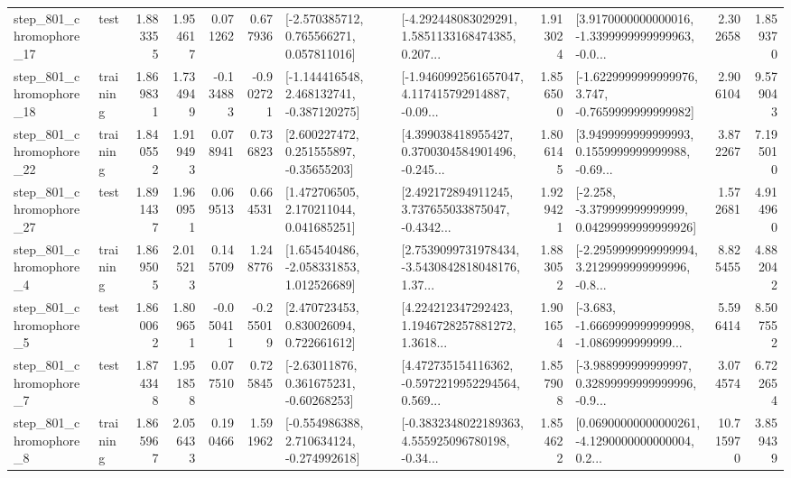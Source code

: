 \begin{tabular}{llrrrrllrlrr}
  step\_801\_chromophore\_17 &      test &      1.883355 &    1.954617 &      0.071262 &  0.677936 &    [-2.570385712, 0.765566271, 0.057811016] &  [-4.292448083029291, 1.5851133168474385, 0.207... &       1.913024 &  [3.9170000000000016, -1.3399999999999963, -0.0... &            2.302658 &          1.859370 \\
  step\_801\_chromophore\_18 &  training &      1.869831 &    1.734949 &     -0.134883 & -0.902721 &   [-1.144416548, 2.468132741, -0.387120275] &  [-1.9460992561657047, 4.117415792914887, -0.09... &       1.856500 &  [-1.6229999999999976, 3.747, -0.7659999999999982] &            2.906104 &          9.579043 \\
  step\_801\_chromophore\_22 &  training &      1.840552 &    1.919493 &      0.078941 &  0.736823 &     [2.600227472, 0.251555897, -0.35655203] &  [4.399038418955427, 0.3700304584901496, -0.245... &       1.806145 &  [3.9499999999999993, 0.1559999999999988, -0.69... &            3.872267 &          7.195010 \\
  step\_801\_chromophore\_27 &      test &      1.891437 &    1.960951 &      0.069513 &  0.664531 &     [1.472706505, 2.170211044, 0.041685251] &  [2.492172894911245, 3.737655033875047, -0.4342... &       1.929421 &  [-2.258, -3.379999999999999, 0.04299999999999926] &            1.572681 &          4.914960 \\
   step\_801\_chromophore\_4 &  training &      1.869505 &    2.015213 &      0.145709 &  1.248776 &    [1.654540486, -2.058331853, 1.012526689] &  [2.7539099731978434, -3.5430842818048176, 1.37... &       1.883052 &  [-2.2959999999999994, 3.2129999999999996, -0.8... &            8.825455 &          4.882042 \\
   step\_801\_chromophore\_5 &      test &      1.860062 &    1.809651 &     -0.050411 & -0.255019 &     [2.470723453, 0.830026094, 0.722661612] &  [4.224212347292423, 1.1946728257881272, 1.3618... &       1.901654 &  [-3.683, -1.6669999999999998, -1.0869999999999... &            5.596414 &          8.507552 \\
   step\_801\_chromophore\_7 &      test &      1.874348 &    1.951858 &      0.077510 &  0.725845 &     [-2.63011876, 0.361675231, -0.60268253] &  [4.472735154116362, -0.5972219952294564, 0.569... &       1.857908 &  [-3.988999999999997, 0.32899999999999996, -0.9... &            3.074574 &          6.722654 \\
   step\_801\_chromophore\_8 &  training &      1.865967 &    2.056433 &      0.190466 &  1.591962 &   [-0.554986388, 2.710634124, -0.274992618] &  [-0.3832348022189363, 4.555925096780198, -0.34... &       1.854622 &  [0.06900000000000261, -4.1290000000000004, 0.2... &           10.715970 &          3.859439 \\

\end{tabular}
